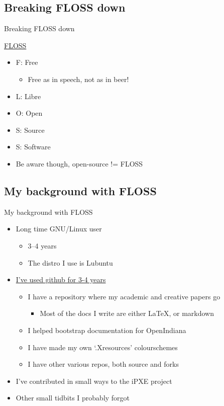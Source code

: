 \documentclass[xcolor=svgnames,handout]{beamer}
\begin{document}
\subsection{Breaking FLOSS down}
\begin{frame}{Breaking FLOSS down}

\href{https://www.gnu.org/philosophy/free-sw.en.html}{FLOSS}
\begin{itemize}
  \item F\@: Free
	  \begin{itemize}
		  \item Free as in speech, not as in beer!
	  \end{itemize}
  \item L\@: Libre
  \item O\@: Open
  \item S\@: Source
  \item S\@: Software
  \item Be aware though, open-source != FLOSS
  \end{itemize}
\end{frame}

\subsection{My background with FLOSS}
\begin{frame}{My background with FLOSS}

	\begin{itemize}
		\item Long time GNU/Linux user
			\begin{itemize}
				\item 3--4 years
				\item The distro I use is Lubuntu
			\end{itemize}
		\item \href{https://github.com/AdrianKoshka}{I've used github for 3-4 years}
			\begin{itemize}
				\item I have a repository where my academic and creative papers go
					\begin{itemize}
				\item Most of the docs I write are either \LaTeX, or markdown
					\end{itemize}
				\item I helped bootstrap documentation for OpenIndiana
				\item I have made my own `.Xresources' colourschemes
				\item I have other various repos, both source and forks
			\end{itemize}
		\item I've contributed in small ways to the iPXE project
		\item Other small tidbits I probably forgot
	\end{itemize}
\end{frame}
\end{document}
